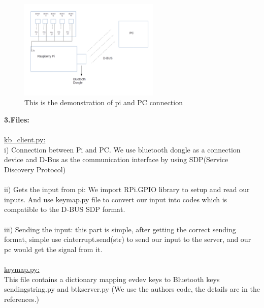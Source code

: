 \documentclass[a4paper]{article}
\begin{document}
\begin{figure} [h]
\centering
\includegraphics[width=0.6\textwidth]{pidemo.png}
\caption{\label{fig:pi}This is the demonstration of pi and PC connection}
\end{figure}


\setlength{\parindent}{0cm}
\textbf{3.Files:} \\\\
\underline{kb\_client.py:}\\
\quad  i) Connection between Pi and PC. We use bluetooth dongle as a connection device and D-Bus as the communication interface by using SDP(Service Discovery Protocol)
\\\\
ii) Gets the input from pi: We import RPi.GPIO library to setup and read our inputs. And use keymap.py file to convert our input into codes which is compatible to the D-BUS SDP format.
\\\\
iii) Sending the input:	this part is simple, after getting the correct sending format, simple use cinterrupt.send(str) to send our input to the server, and our pc would get the signal from it.
\\\\
\underline{keymap.py:} \\This file contains a dictionary mapping evdev keys to Bluetooth keys 
sendingstring.py and btkserver.py (We use the authors code, the details are in the references.)
\end{document}
